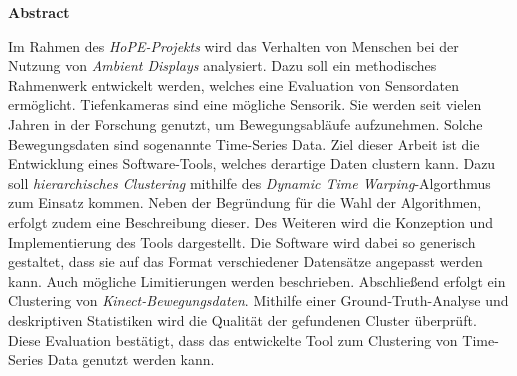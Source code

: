 \vspace*{2cm}

\begin{center}
    \textbf{Abstract}
\end{center}

\vspace*{1cm}

\noindent
Im Rahmen des \emph{HoPE-Projekts} wird das Verhalten von Menschen
bei der Nutzung von \emph{Ambient Displays} analysiert.
Dazu soll ein methodisches Rahmenwerk entwickelt werden,
welches eine Evaluation von Sensordaten ermöglicht.
Tiefenkameras sind eine mögliche Sensorik.
Sie werden seit vielen Jahren in der Forschung genutzt,
um Bewegungsabläufe aufzunehmen.
Solche Bewegungsdaten sind sogenannte Time-Series Data.
Ziel dieser Arbeit ist die Entwicklung eines Software-Tools,
welches derartige Daten clustern kann.
Dazu soll \emph{hierarchisches Clustering}
mithilfe des \emph{Dynamic Time Warping}-Algorthmus zum Einsatz kommen.
Neben der Begründung für die Wahl der Algorithmen,
erfolgt zudem eine Beschreibung dieser.
Des Weiteren wird die Konzeption und Implementierung des Tools dargestellt.
Die Software wird dabei so generisch gestaltet,
dass sie auf das Format verschiedener Datensätze angepasst werden kann.
Auch mögliche Limitierungen werden beschrieben.
Abschließend erfolgt ein Clustering von \emph{Kinect-Bewegungsdaten}.
Mithilfe einer Ground-Truth-Analyse und deskriptiven Statistiken
wird die Qualität der gefundenen Cluster überprüft.
Diese Evaluation bestätigt, dass das entwickelte Tool zum Clustering
von Time-Series Data genutzt werden kann.